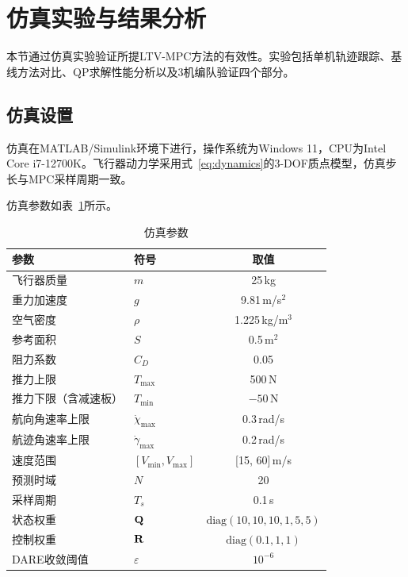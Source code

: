 \section{仿真实验与结果分析}\label{sec:experiments}

本节通过仿真实验验证所提LTV-MPC方法的有效性。实验包括单机轨迹跟踪、基线方法对比、QP求解性能分析以及3机编队验证四个部分。

\subsection{仿真设置}\label{sec:sim_setup}

仿真在MATLAB/Simulink环境下进行，操作系统为Windows 11，CPU为Intel Core i7-12700K。飞行器动力学采用式~\eqref{eq:dynamics}的3-DOF质点模型，仿真步长与MPC采样周期一致。

仿真参数如表~\ref{tab:params}所示。

\begin{table}[htbp]
\centering
\caption{仿真参数}\label{tab:params}
\begin{tabular}{llc}
\toprule
参数 & 符号 & 取值 \\
\midrule
飞行器质量 & $m$ & 25\,kg \\
重力加速度 & $g$ & 9.81\,m/s$^2$ \\
空气密度 & $\rho$ & 1.225\,kg/m$^3$ \\
参考面积 & $S$ & 0.5\,m$^2$ \\
阻力系数 & $C_D$ & 0.05 \\
\midrule
推力上限 & $T_{\max}$ & 500\,N \\
推力下限（含减速板） & $T_{\min}$ & $-50$\,N \\
航向角速率上限 & $\dot{\chi}_{\max}$ & 0.3\,rad/s \\
航迹角速率上限 & $\dot{\gamma}_{\max}$ & 0.2\,rad/s \\
速度范围 & $[V_{\min}, V_{\max}]$ & [15, 60]\,m/s \\
\midrule
预测时域 & $N$ & 20 \\
采样周期 & $T_s$ & 0.1\,s \\
状态权重 & $\mathbf{Q}$ & $\text{diag}(10,10,10,1,5,5)$ \\
控制权重 & $\mathbf{R}$ & $\text{diag}(0.1,1,1)$ \\
DARE收敛阈值 & $\varepsilon$ & $10^{-6}$ \\
\bottomrule
\end{tabular}
\end{table}

